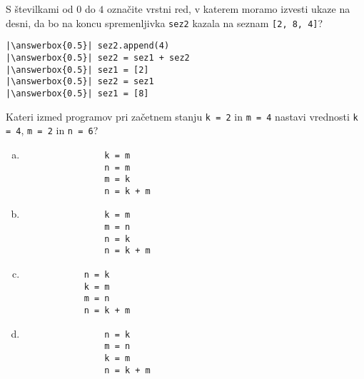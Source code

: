 \documentclass[arhiv, 10pt]{../izpit}
\newcommand{\inlinepy}[1]{\texttt{#1}}
\newcommand{\answerbox}[1]{\framebox{\vphantom{\large M}\hspace{#1cm}}}
\begin{document}
        \naloga*
        \begin{multicols}{2}
        \noindent 
        S številkami od $0$ do $4$ označite vrstni red, v katerem moramo izvesti ukaze na desni, da bo na koncu spremenljivka \inlinepy{sez2} kazala na seznam \inlinepy{[2, 8, 4]}?
    
        \columnbreak
        \noindent
        \begin{verbatim}
|\answerbox{0.5}| sez2.append(4)
|\answerbox{0.5}| sez2 = sez1 + sez2
|\answerbox{0.5}| sez1 = [2]
|\answerbox{0.5}| sez2 = sez1
|\answerbox{0.5}| sez1 = [8]

        \end{verbatim}
        \end{multicols}
    
            
        \naloga*
        
        Kateri izmed programov pri začetnem stanju
            \inlinepy{k = 2} in
            \inlinepy{m = 4}
        nastavi vrednosti
            \inlinepy{k = 4},
            \inlinepy{m = 2} in
            \inlinepy{n = 6}?
    
        \begin{multicols}{4}
        \begin{enumerate}[(a)]
\item 
                \begin{verbatim}
                k = m
                n = m
                m = k
                n = k + m
                \end{verbatim}
            
\item 
                \begin{verbatim}
                k = m
                m = n
                n = k
                n = k + m
                \end{verbatim}
            
\item 
            \begin{verbatim}
            n = k
            k = m
            m = n
            n = k + m
            \end{verbatim}
        
\item 
                \begin{verbatim}
                n = k
                m = n
                k = m
                n = k + m
                \end{verbatim}
            
\end{enumerate}

        \end{multicols}
    
\end{document}
